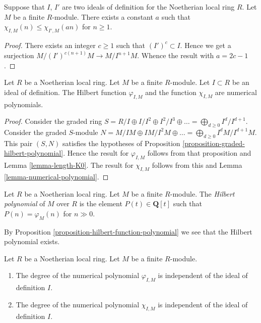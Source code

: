 \begin{lemma}
\label{lemma-hilbert-change-I}
Suppose that $I$, $I'$ are two ideals of definition
for the Noetherian local ring $R$. Let $M$ be a
finite $R$-module. There exists a constant $a$ such that
$\chi_{I, M}(n) \leq \chi_{I', M}(an)$ for $n \geq 1$.
\end{lemma}

\begin{proof}
There exists an integer $c \geq 1$ such that $(I')^c \subset I$.
Hence we get a surjection $M/(I')^{c(n + 1)}M \to M/I^{n + 1}M$.
Whence the result with $a = 2c - 1$.
\end{proof}

\begin{proposition}
\label{proposition-hilbert-function-polynomial}
Let $R$ be a Noetherian local ring. Let $M$ be a finite $R$-module.
Let $I \subset R$ be an ideal of definition.
The Hilbert function $\varphi_{I, M}$ and the function
$\chi_{I, M}$ are numerical polynomials.
\end{proposition}

\begin{proof}
Consider the graded ring $S = R/I \oplus I/I^2 \oplus I^2/I^3 \oplus
\ldots = \bigoplus_{d \geq 0} I^d/I^{d + 1}$. Consider the graded
$S$-module $N = M/IM \oplus IM/I^2M \oplus \ldots =
\bigoplus_{d \geq 0} I^dM/I^{d + 1}M$. This pair $(S, N)$ satisfies
the hypotheses of Proposition \ref{proposition-graded-hilbert-polynomial}.
Hence the result for $\varphi_{I, M}$ follows from that proposition and
Lemma \ref{lemma-length-K0}. The result for $\chi_{I, M}$ follows
from this and Lemma \ref{lemma-numerical-polynomial}.
\end{proof}

\begin{definition}
\label{definition-hilbert-polynomial}
Let $R$ be a Noetherian local ring. Let $M$ be a finite $R$-module.
The {\it Hilbert polynomial} of $M$ over $R$ is the element
$P(t) \in \mathbf{Q}[t]$ such that $P(n) = \varphi_M(n)$ for $n \gg 0$.
\end{definition}

\noindent
By Proposition \ref{proposition-hilbert-function-polynomial}
we see that the Hilbert polynomial exists.

\begin{lemma}
\label{lemma-d-independent}
Let $R$ be a Noetherian local ring. Let $M$ be a finite $R$-module.
\begin{enumerate}
\item The degree of the numerical polynomial $\varphi_{I, M}$ is independent
of the ideal of definition $I$.
\item The degree of the numerical polynomial $\chi_{I, M}$ is independent
of the ideal of definition $I$.
\end{enumerate}
\end{lemma}

